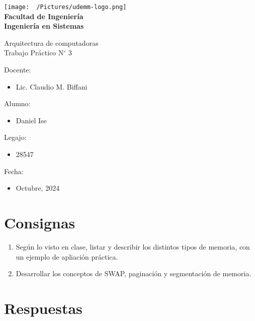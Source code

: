 \documentclass[12pt]{article}
\begin{document}
\thispagestyle{empty}

\begin{center}
  \vspace*{.5cm}
  \texttt{[image: ~/Pictures/udemm-logo.png]}\\
  \vspace{.2cm}
  \Large
  \textbf{Facultad de Ingeniería}\\
  \textbf{Ingeniería en Sistemas}\\
  \vspace{2cm}

  \Huge
  Arquitectura de computadoras\\
  Trabajo Práctico N\(^\circ\) 3\\
  \vfill

  \raggedright
  \Large
  Docente:
  \begin{itemize}
    \item[] Lic. Claudio M. Biffani \\
  \end{itemize}
  Alumno:
  \begin{itemize}
    \item[] Daniel Ise
  \end{itemize}
  Legajo:
  \begin{itemize}
    \item[] 28547
  \end{itemize}
  Fecha:
  \begin{itemize}
    \item[] Octubre, 2024
  \end{itemize}
\end{center}

\pagebreak

\tableofcontents

\pagebreak

\section{Consignas}

\begin{enumerate}
  \item Según lo visto en clase, listar y describir los distintos tipos de
        memoria, con un ejemplo de apliación práctica.
  \item Desarrollar los conceptos de SWAP, paginación y segmentación de
        memoria.
\end{enumerate}

\section{Respuestas}
\end{document}
